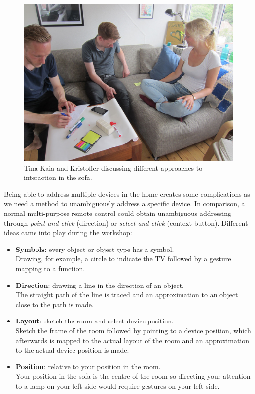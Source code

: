 \begin{figure}[h]
  \centering
  \includegraphics[width=.9\textwidth]{figures/kaia_moos2}
  \caption{Tina Kaia and Kristoffer discussing different approaches to interaction in the sofa.}
   \label{kaia_moos2}
\end{figure}

Being able to address multiple devices in the home creates some complications as we need a method to unambiguously address a specific device.
In comparison, a normal multi-purpose remote control could obtain unambiguous addressing through \emph{point-and-click} (direction) or \emph{select-and-click} (context button).
Different ideas came into play during the workshop: 

\begin{itemize}
  \item{\textbf{Symbols}: every object or object type has a symbol.\\
        Drawing, for example, a circle to indicate the TV followed by a gesture mapping to a function.
  }
  \item{\textbf{Direction}: drawing a line in the direction of an object.\\
        The straight path of the line is traced and an approximation to an object close to the path is made.
  }
  \item{\textbf{Layout}: sketch the room and select device position.\\
        Sketch the frame of the room followed by pointing to a device position, which afterwards is mapped to the actual layout of the room and an approximation to the actual device position is made.
  }
  \item{\textbf{Position}: relative to your position in the room.\\
        Your position in the sofa is the centre of the room so directing your attention to a lamp on your left side would require gestures on your left side.
  }
\end{itemize}


